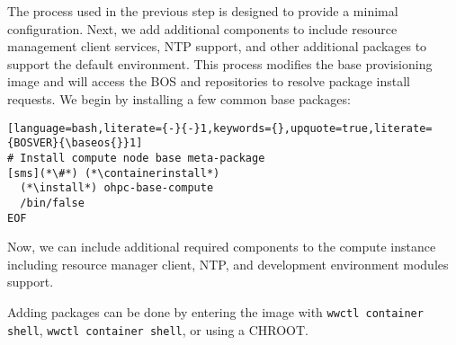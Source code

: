 The process used in the previous step is designed to
provide a minimal \baseOS{} configuration. Next, we add additional components
to include resource management client services, NTP support, and
other additional packages to support the default \OHPC{} environment. This
process modifies the base provisioning image and will access the BOS and \OHPC{}
repositories to resolve package install requests. We begin by installing a few
common base packages:

\begin{lstlisting}[language=bash,literate={-}{-}1,keywords={},upquote=true,literate={BOSVER}{\baseos{}}1]
# Install compute node base meta-package
[sms](*\#*) (*\containerinstall*)
  (*\install*) ohpc-base-compute
  /bin/false
EOF
\end{lstlisting}

\noindent Now, we can include additional required components to the compute
instance including resource manager client, NTP, and development environment modules support.

Adding packages can be done by entering the image with \texttt{wwctl container shell},
\texttt{wwctl container shell}, or using a CHROOT.

